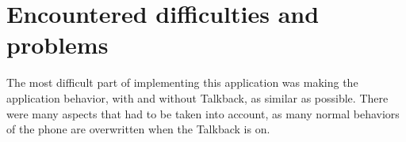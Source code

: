 \documentclass[a4paper,twoside,12pt]{book}
\begin{document}
\section{Encountered difficulties and problems}

\par The most difficult part of implementing this application was making the application behavior, with and without Talkback, as similar as possible. There were many aspects that had to be taken into account, as many normal behaviors of the phone are overwritten when the Talkback is on.

 
\end{document}
